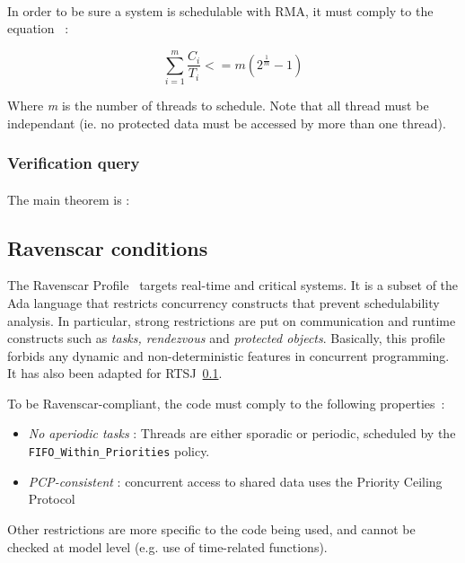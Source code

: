 \paragraph{}
In order to be sure a system is schedulable with RMA, it must comply
to the equation~\cite{LiuLayland73} :

$$
\sum_{i=1}^{m} \frac{C_{i}}{T_{i}} <= m (2^{\frac{1}{m}} - 1)
$$

Where \textit{m} is the number of threads to schedule. Note that all 
thread must be independant (ie. no protected data must be accessed 
by more than one thread).

\subsubsection {Verification query}
\paragraph{}
The main theorem is :


\subsection {Ravenscar conditions}

The Ravenscar Profile~\cite{Ravenscar03} targets real-time and
critical systems. It is a subset of the Ada language that restricts
concurrency constructs that prevent schedulability analysis. In
particular, strong restrictions are put on communication and runtime
constructs such as \textit{tasks, rendezvous} and \textit{protected
  objects}. Basically, this profile forbids any dynamic and
non-deterministic features in concurrent programming. It has also been
adapted for RTSJ~\ref{}.

To be Ravenscar-compliant, the code must comply to the following
properties~:

\begin{itemize}
\item \textit{No aperiodic tasks} : Threads are either sporadic or
  periodic, scheduled by the \texttt{FIFO\_Within\_Priorities} policy.

\item \textit{PCP-consistent} : concurrent access to shared data uses
  the Priority Ceiling Protocol~\cite{SRL90}
\end{itemize}

Other restrictions are more specific to the code being used, and
cannot be checked at model level (e.g. use of time-related functions).


